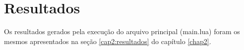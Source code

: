 \section{Resultados}
Os resultados gerados pela execução do arquivo principal (main.lua) foram os mesmos apresentados na seção \ref{cap2:resultados} do capítulo \ref{chap2}.
